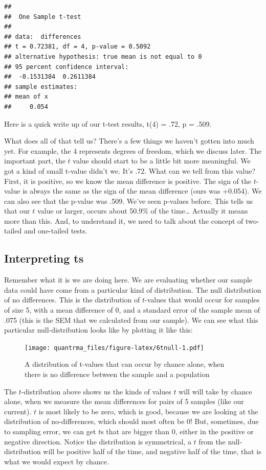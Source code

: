 \documentclass[
]{book}
\begin{document}
\begin{verbatim}
## 
## 	One Sample t-test
## 
## data:  differences
## t = 0.72381, df = 4, p-value = 0.5092
## alternative hypothesis: true mean is not equal to 0
## 95 percent confidence interval:
##  -0.1531384  0.2611384
## sample estimates:
## mean of x 
##     0.054
\end{verbatim}

Here is a quick write up of our t-test results, t(4) = .72, p = .509.

What does all of that tell us? There's a few things we haven't gotten into much yet. For example, the 4 represents degrees of freedom, which we discuss later. The important part, the \(t\) value should start to be a little bit more meaningful. We got a kind of small t-value didn't we. It's .72. What can we tell from this value? First, it is positive, so we know the mean difference is positive. The sign of the \(t\)-value is always the same as the sign of the mean difference (ours was +0.054). We can also see that the p-value was .509. We've seen p-values before. This tells us that our \(t\) value or larger, occurs about 50.9\% of the time\ldots{} Actually it means more than this. And, to understand it, we need to talk about the concept of two-tailed and one-tailed tests.

\hypertarget{interpreting-ts}{%
\subsection{Interpreting ts}\label{interpreting-ts}}

Remember what it is we are doing here. We are evaluating whether our sample data could have come from a particular kind of distribution. The null distribution of no differences. This is the distribution of \(t\)-values that would occur for samples of size 5, with a mean difference of 0, and a standard error of the sample mean of .075 (this is the SEM that we calculated from our sample). We can see what this particular null-distribution looks like by plotting it like this:

\begin{figure}
\centering
\texttt{[image: quantrma\_files/figure-latex/6tnull-1.pdf]}
\caption{\label{fig:6tnull}A distribution of t-values that can occur by chance alone, when there is no difference between the sample and a population}
\end{figure}

The \(t\)-distribution above shows us the kinds of values \(t\) will will take by chance alone, when we measure the mean differences for pairs of 5 samples (like our current). \(t\) is most likely to be zero, which is good, because we are looking at the distribution of no-differences, which should most often be 0! But, sometimes, due to sampling error, we can get \(t\)s that are bigger than 0, either in the positive or negative direction. Notice the distribution is symmetrical, a \(t\) from the null-distribution will be positive half of the time, and negative half of the time, that is what we would expect by chance.
\end{document}
